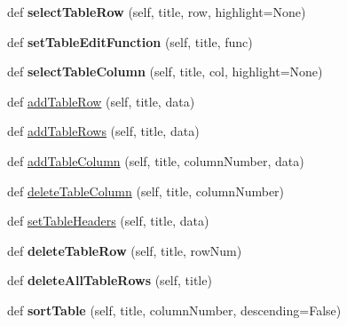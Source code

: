 \begin{DoxyCompactItemize}
def {\bfseries select\+Table\+Row} (self, title, row, highlight=None)
\item 
\mbox{\label{class_python_01_g_u_i_1_1appjar_1_1gui_aed0711a0fab4f08ae2f123f2a99df38c}} 
def {\bfseries set\+Table\+Edit\+Function} (self, title, func)
\item 
\mbox{\label{class_python_01_g_u_i_1_1appjar_1_1gui_a27683b126f18f50c81bf186939fbbc04}} 
def {\bfseries select\+Table\+Column} (self, title, col, highlight=None)
\item 
def \hyperlink{class_python_01_g_u_i_1_1appjar_1_1gui_aa4837b55b3c3eade8bad73f7a887380b}{add\+Table\+Row} (self, title, data)
\item 
def \hyperlink{class_python_01_g_u_i_1_1appjar_1_1gui_afad6a7618603a37b5bf519123bf013b7}{add\+Table\+Rows} (self, title, data)
\item 
def \hyperlink{class_python_01_g_u_i_1_1appjar_1_1gui_ab23cc6b9650da8d4398dddaaa3bcec03}{add\+Table\+Column} (self, title, column\+Number, data)
\item 
def \hyperlink{class_python_01_g_u_i_1_1appjar_1_1gui_af696592c47136b2da50a4aa7b1b3e45b}{delete\+Table\+Column} (self, title, column\+Number)
\item 
def \hyperlink{class_python_01_g_u_i_1_1appjar_1_1gui_a1707714dd4a84b284f8d07faa14f16c1}{set\+Table\+Headers} (self, title, data)
\item 
\mbox{\label{class_python_01_g_u_i_1_1appjar_1_1gui_ad4afec6d381d2ddc2d7e272c9e15d2fa}} 
def {\bfseries delete\+Table\+Row} (self, title, row\+Num)
\item 
\mbox{\label{class_python_01_g_u_i_1_1appjar_1_1gui_acd2cfe42328dae650d8fff84054155c4}} 
def {\bfseries delete\+All\+Table\+Rows} (self, title)
\item 
\mbox{\label{class_python_01_g_u_i_1_1appjar_1_1gui_afa96f4b8f53c364055470eab0f5f49a5}} 
def {\bfseries sort\+Table} (self, title, column\+Number, descending=False)
\item 
\mbox{\label{class_python_01_g_u_i_1_1appjar_1_1gui_a6d0cadb060e49fa8693446666f45bcf4}} 

\end{DoxyCompactItemize}
